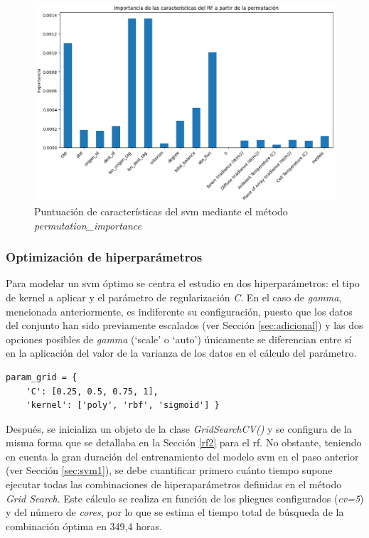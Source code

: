 \begin{figure}[H]
    \centering
    \includegraphics[width=1\textwidth]{img/desarrollo/svm/importance4.png}
    \caption{Puntuación de características del \acrshort{svm} mediante el método \textit{permutation\_importance}}
    \label{fig:imp4}
\end{figure}

\subsubsection{Optimización de hiperparámetros}
\label{sec:svm2}

Para modelar un \gls{svm} óptimo se centra el estudio en dos hiperparámetros: el tipo de kernel a aplicar y el parámetro de regularización \textit{C}. En el caso de \textit{gamma}, mencionada anteriormente, es indiferente su configuración, puesto que los datos del conjunto han sido previamente escalados (ver Sección \ref{sec:adicional}) y las dos opciones posibles de \textit{gamma} (`scale' o `auto') únicamente se diferencian entre sí en la aplicación del valor de la varianza de los datos en el cálculo del parámetro. 

\vspace{3mm}

\begin{lstlisting}[style=Python, caption={Cuadrícula de parámetros SVM}]
  param_grid = {
    'C': [0.25, 0.5, 0.75, 1], 
    'kernel': ['poly', 'rbf', 'sigmoid'] }
\end{lstlisting}

\vspace{3mm}

Después, se inicializa un objeto de la clase \textit{GridSearchCV()} y se configura de la misma forma que se detallaba en la Sección \ref{rf2} para el \gls{rf}. No obstante, teniendo en cuenta la gran duración del entrenamiento del modelo \gls{svm} en el paso anterior (ver Sección \ref{sec:svm1}), se debe cuantificar primero cuánto tiempo supone ejecutar todas las combinaciones de hiperaparámetros definidas en el método \textit{Grid Search}. Este cálculo se realiza en función de los pliegues configurados (\textit{cv=5}) y del número de \textit{cores}, por lo que se estima el tiempo total de búsqueda de la combinación óptima en 349,4 horas.

